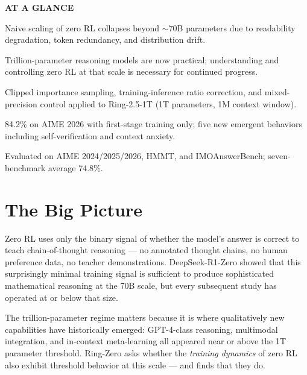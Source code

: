 \documentclass[10pt,twocolumn]{article}
\begin{document}
\begin{mdframed}[backgroundcolor=boxgray,linecolor=rulered,linewidth=1pt,
    innerleftmargin=6pt,innerrightmargin=6pt,
    innertopmargin=6pt,innerbottommargin=6pt]
\textbf{\small AT A GLANCE}\par\vspace{4pt}
\begin{description}[leftmargin=0pt,labelsep=4pt,itemsep=2pt,parsep=0pt,
    font=\small\bfseries]
  \item[Problem:] Naive scaling of zero RL collapses beyond $\sim$70B
    parameters due to readability degradation, token redundancy, and
    distribution drift.
  \item[Why it matters:] Trillion-parameter reasoning models are now
    practical; understanding and controlling zero RL at that scale is
    necessary for continued progress.
  \item[Method:] Clipped importance sampling, training-inference ratio
    correction, and mixed-precision control applied to Ring-2.5-1T (1T
    parameters, 1M context window).
  \item[Result:] 84.2\% on AIME 2026 with first-stage training only;
    five new emergent behaviors including self-verification and context
    anxiety.
  \item[Evidence:] Evaluated on AIME 2024/2025/2026, HMMT, and
    IMOAnswerBench; seven-benchmark average 74.8\%.
\end{description}
\end{mdframed}

\section{The Big Picture}

Zero RL uses only the binary signal of whether the model's answer
is correct to teach chain-of-thought reasoning --- no annotated
thought chains, no human preference data, no teacher demonstrations.
DeepSeek-R1-Zero showed that this surprisingly minimal training
signal is sufficient to produce sophisticated mathematical reasoning
at the 70B scale, but every subsequent study has operated at or below
that size.

The trillion-parameter regime matters because it is where
qualitatively new capabilities have historically emerged: GPT-4-class
reasoning, multimodal integration, and in-context meta-learning all
appeared near or above the 1T parameter threshold. Ring-Zero asks
whether the \emph{training dynamics} of zero RL also exhibit threshold
behavior at this scale --- and finds that they do.
\end{document}
